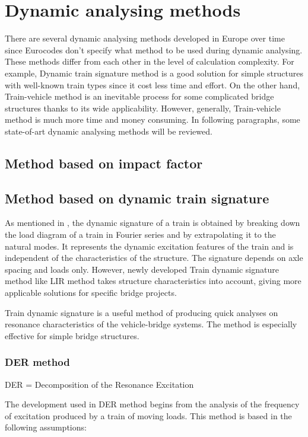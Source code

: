 \section{Dynamic analysing methods}\label{sec:dynamic-analysing-methods}
There are several dynamic analysing methods developed in Europe over time since Eurocodes don't specify what method to be used during dynamic analysing. These methods differ from each other in the level of calculation complexity. For example, Dynamic train signature method is a good solution for simple structures with well-known train types since it cost less time and effort. On the other hand, Train-vehicle method is an inevitable process for some complicated bridge structures thanks to its wide applicability. However, generally, Train-vehicle method is much more time and money consuming. In following paragraphs, some state-of-art dynamic analysing methods will be reviewed.


\subsection{Method based on impact factor}

\subsection{Method based on dynamic train signature}
As mentioned in \cite[A.4.3]{uic}, the dynamic signature of a train is obtained by breaking down the load diagram of a train in Fourier series and by extrapolating it to the natural modes. It represents the dynamic excitation features of the train and is independent of the characteristics of the structure. The signature depends on axle spacing and loads only. However, newly developed Train dynamic signature method like LIR method takes structure characteristics into account, giving more applicable solutions for specific bridge projects.

Train dynamic signature is a useful method of producing quick analyses on resonance characteristics of the vehicle-bridge systems. The method is especially effective for simple bridge structures.

\subsubsection{DER method}

DER = Decomposition of the Resonance Excitation

The development used in DER method begins from the analysis of the frequency of excitation produced by a train of moving loads. This method is based in the following assumptions:

